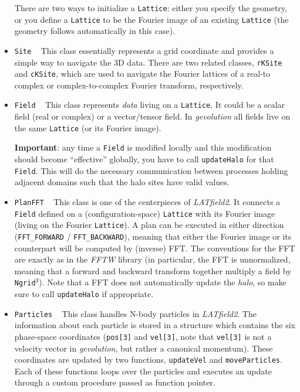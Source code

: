 \documentclass[a4paper,10pt]{article}
\begin{document}
\begin{itemize}
 There are two ways to initialize a \texttt{Lattice}: either you specify the geometry, or you define a \texttt{Lattice} to be the Fourier
 image of an existing \texttt{Lattice} (the geometry follows automatically in this case). 
 
 \item[] \hspace{-25pt}\texttt{Site} ~ This class essentially represents a grid coordinate and provides a simple way to navigate the 3D
 data. There are two related classes, \texttt{rKSite} and \texttt{cKSite}, which are used to navigate the Fourier lattices of a real-to
 complex or complex-to-complex Fourier transform, respectively.
 
 \item[] \hspace{-25pt}\texttt{Field} ~ This class represents \textit{data} living on a \texttt{Lattice}. It could be a scalar field (real
 or complex) or a vector/tensor field. In \textit{gevolution} all fields live on the same \texttt{Lattice} (or its Fourier image).
 
 \textbf{Important}: any time a \texttt{Field} is modified locally and this modification should become ``effective'' globally, you have to
 call \texttt{updateHalo} for that \texttt{Field}. This will do the necessary communication between processes holding adjacent domains such
 that the halo sites have valid values.
 
 \item[] \hspace{-25pt}\texttt{PlanFFT} ~ This class is one of the centerpieces of \textit{LATfield2}. It connects a \texttt{Field} defined
 on a (configuration-space) \texttt{Lattice} with its Fourier image (living on the Fourier \texttt{Lattice}). A plan can be executed in
 either direction (\texttt{FFT\_FORWARD} / \texttt{FFT\_BACKWARD}), meaning that either the Fourier image or its counterpart will be
 computed by (inverse) FFT. The conventions for the FFT are exactly as in the \textit{FFTW} library (in particular, the FFT is unnormalized,
 meaning that a forward and backward transform together multiply a field by \texttt{Ngrid}$^\mathsf{3}$). Note that a FFT does not
 automatically update the \textit{halo}, so make sure to call \texttt{updateHalo} if appropriate.
 
 \item[] \hspace{-25pt}\texttt{Particles} ~ This class handles N-body particles in \textit{LATfield2}. The information about each particle
 is stored in a structure which contains the six phase-space coordinates (\texttt{pos[3]} and \texttt{vel[3]}, note that \texttt{vel[3]} is
 not a velocity vector in \textit{gevolution}, but rather a canonical momentum). These coordinates are updated by two functions,
 \texttt{updateVel} and \texttt{moveParticles}. Each of these functions loops over the particles and executes an update through a custom
 procedure passed as function pointer.
 

\end{itemize}
\end{document}

